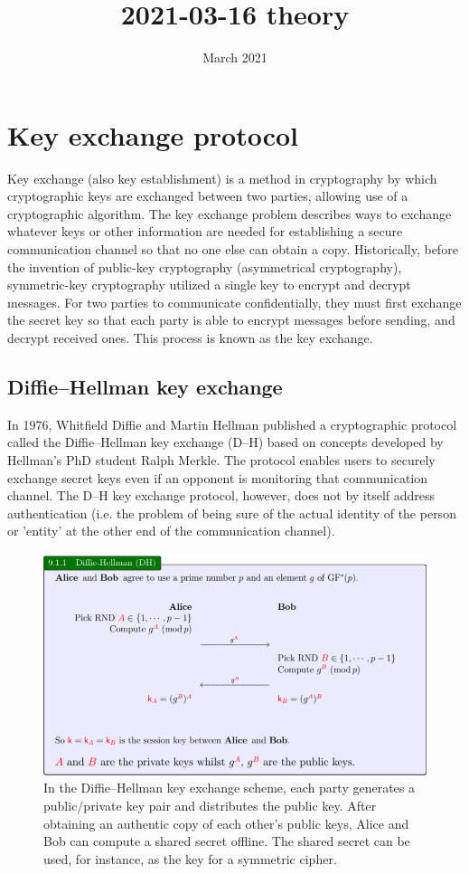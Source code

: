 \documentclass{article}
\title{2021-03-16 theory}
\author{}
\date{March 2021}
\begin{document}
\maketitle

\section{Key exchange protocol}
Key exchange (also key establishment) is a method in cryptography by which cryptographic keys are exchanged between two parties, allowing use of a cryptographic algorithm. The key exchange problem describes ways to exchange whatever keys or other information are needed for establishing a secure communication channel so that no one else can obtain a copy. Historically, before the invention of public-key cryptography (asymmetrical cryptography), symmetric-key cryptography utilized a single key to encrypt and decrypt messages. For two parties to communicate confidentially, they must first exchange the secret key so that each party is able to encrypt messages before sending, and decrypt received ones. This process is known as the key exchange.


\subsection{Diffie–Hellman key exchange}
In 1976, Whitfield Diffie and Martin Hellman published a cryptographic protocol called the Diffie–Hellman key exchange (D–H) based on concepts developed by Hellman's PhD student Ralph Merkle. The protocol enables users to securely exchange secret keys even if an opponent is monitoring that communication channel. The D–H key exchange protocol, however, does not by itself address authentication (i.e. the problem of being sure of the actual identity of the person or 'entity' at the other end of the communication channel).
\begin{figure}[htb]
	\begin{center}
  		\includegraphics[width=1 \textwidth,]{Diffie-Hellman.png}
 	\end{center}
 	\caption{In the Diffie–Hellman key exchange scheme, each party generates a public/private key pair and distributes the public key. After obtaining an authentic copy of each other's public keys, Alice and Bob can compute a shared secret offline. The shared secret can be used, for instance, as the key for a symmetric cipher.}
 	\label{ciphering}
\end{figure}
\newpage
\end{document}
